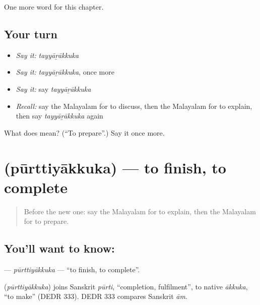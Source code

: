 \begin{grammarlens}[title={What you've built}]
One more word for this chapter.
\end{grammarlens}

\subsection*{Your turn}
\begin{itemize}
\raggedright
  \item \emph{Say it:} \emph{tayyāṟākkuka}
  \item \emph{Say it:} \emph{tayyāṟākkuka}, once more
  \item \emph{Say it:} say \emph{tayyāṟākkuka}
  \item \emph{Recall:} say the Malayalam for to discuss, then the Malayalam for to explain, then say \emph{tayyāṟākkuka} again
\end{itemize}

\begin{tcolorbox}[breakable,colback=teal!4,colframe=teal!35!black,title={Before you move on}]
What does  mean? (\textquotedblleft{}To prepare\textquotedblright{}.) Say it once more.
\end{tcolorbox}
\section[\texorpdfstring{\ml{പൂർത്തിയാക്കുക} (pūrttiyākkuka)}{പൂർത്തിയാക്കുക (pūrttiyākkuka)}]{ (pūrttiyākkuka) — to finish, to complete}

\label{lesson:ML-C226-purttiyakkuka}



\begin{quote}
Before the new one: say the Malayalam for to explain, then the Malayalam for to prepare.
\end{quote}

\subsection*{You'll want to know: }
\textbf{} — \emph{pūrttiyākkuka} — \textquotedblleft{}to finish, to complete\textquotedblright{}.

\begin{cousinweb}
\textbf{} (\emph{pūrttiyākkuka}) joins Sanskrit \emph{pūrti}, \textquotedblleft{}completion, fulfilment\textquotedblright{}, to native \emph{ākkuka}, \textquotedblleft{}to make\textquotedblright{} (DEDR 333). DEDR 333 compares Sanskrit \emph{ām}.
\end{cousinweb}

